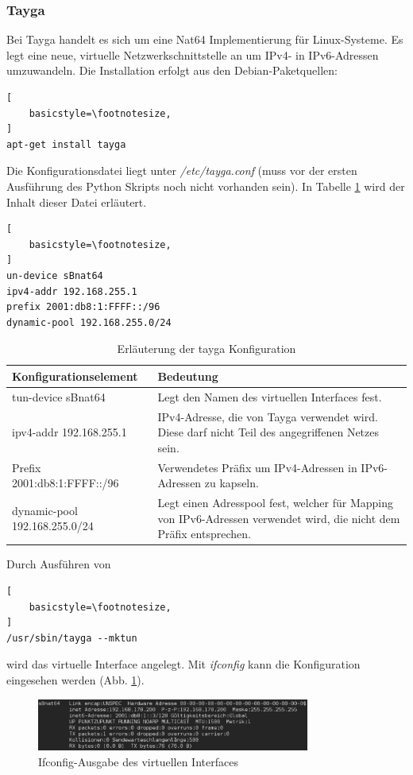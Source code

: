 \subsubsection*{Tayga}
Bei Tayga handelt es sich um eine Nat64 Implementierung für Linux-Systeme. Es legt eine neue, virtuelle Netzwerkschnittstelle an um IPv4- in IPv6-Adressen umzuwandeln. Die Installation erfolgt aus den Debian-Paketquellen:
\lstset{language=bash}
\begin{lstlisting}[
	basicstyle=\footnotesize,
]
apt-get install tayga
\end{lstlisting}


Die Konfigurationsdatei liegt unter \textit{/etc/tayga.conf} (muss vor der ersten Ausführung des Python Skripts noch nicht vorhanden sein). In Tabelle \ref{tab:taygaConfig} wird der Inhalt dieser Datei erläutert.
\begin{lstlisting}[
	basicstyle=\footnotesize,
]
un-device sBnat64
ipv4-addr 192.168.255.1
prefix 2001:db8:1:FFFF::/96
dynamic-pool 192.168.255.0/24
\end{lstlisting}

\begin{table}
	\centering
		\begin{tabular}{lp{9cm}}
			Konfigurationselement & Bedeutung \\ \hline
			tun-device sBnat64 & Legt den Namen des virtuellen Interfaces fest. \\
			ipv4-addr 192.168.255.1 & IPv4-Adresse, die von Tayga verwendet wird. Diese darf nicht Teil des angegriffenen Netzes sein. \\
			Prefix 2001:db8:1:FFFF::/96 & Verwendetes Präfix um IPv4-Adressen in IPv6-Adressen zu kapseln. \\
			dynamic-pool 192.168.255.0/24 & Legt einen Adresspool fest, welcher für Mapping von IPv6-Adressen verwendet wird, die nicht dem Präfix entsprechen. \\
		\end{tabular}
	\caption{Erläuterung der tayga Konfiguration}
	\label{tab:taygaConfig}
\end{table}

\FloatBarrier

Durch Ausführen von 
\lstset{language=bash}
\begin{lstlisting}[
	basicstyle=\footnotesize,
]
/usr/sbin/tayga --mktun
\end{lstlisting}

wird das virtuelle Interface angelegt. Mit \textit{ifconfig} kann die Konfiguration eingesehen werden (Abb. \ref{fig:tunInterface}). 
\begin{figure}[h!]
	\centering
	\includegraphics[width=0.80\textwidth]{bilder/fakeIPv6/tunInterface.pdf}
	\caption{Ifconfig-Ausgabe des virtuellen Interfaces}
	\label{fig:tunInterface}
\end{figure}


